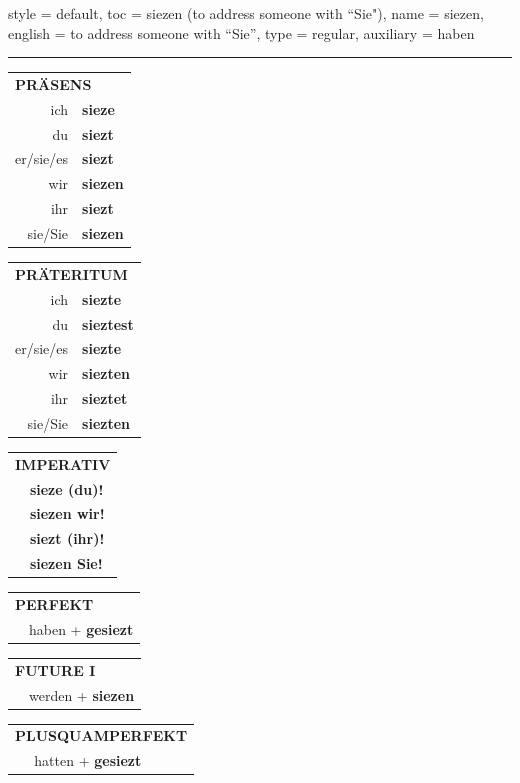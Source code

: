 \begin{verbentry}{
  style = {default},
  toc = {siezen (to address someone with ``Sie")},
  name = {siezen},
  english = {to address someone with \enquote{Sie}},
  type = {regular},
  auxiliary = {haben}
}


\vspace{5pt}
\hrule
\vspace{5pt}

\begin{tabular}{rl}
\multicolumn{2}{l}{\textbf{PRÄSENS}}\\
ich & \textbf{sieze}\\
du & \textbf{siezt}\\
er/sie/es & \textbf{siezt}\\
wir & \textbf{siezen}\\
ihr & \textbf{siezt}\\
sie/Sie & \textbf{siezen}\\
\end{tabular}
\hfill
\begin{tabular}{rl}
\multicolumn{2}{l}{\textbf{PRÄTERITUM}}\\
ich & \textbf{siezte}\\
du & \textbf{sieztest}\\
er/sie/es & \textbf{siezte}\\
wir & \textbf{siezten}\\
ihr & \textbf{sieztet}\\
sie/Sie & \textbf{siezten}\\
\end{tabular}
\hfill
\begin{tabular}{rl}
\multicolumn{2}{l}{\textbf{IMPERATIV}}\\
& \textbf{sieze (du)!}\\
& \textbf{siezen wir!}\\
& \textbf{siezt (ihr)!}\\
& \textbf{siezen Sie!}\\
\end{tabular}

\vspace{10pt}

\begin{tabular}{rl}
\multicolumn{2}{l}{\textbf{PERFEKT}}\\
& haben + \textbf{gesiezt}\\
\end{tabular}
\hfill
\begin{tabular}{rl}
\multicolumn{2}{l}{\textbf{FUTURE I}}\\
& werden + \textbf{siezen}\\
\end{tabular}
\hfill
\begin{tabular}{rl}
\multicolumn{2}{l}{\textbf{PLUSQUAMPERFEKT}}\\
& hatten + \textbf{gesiezt}\\
\end{tabular}


\end{verbentry}
